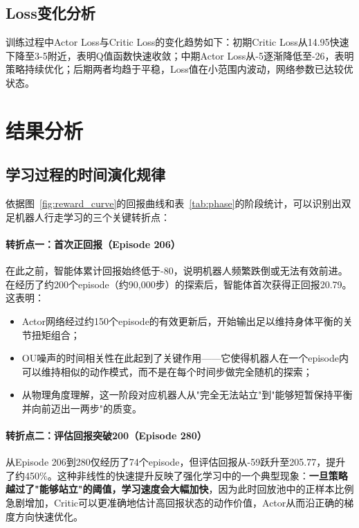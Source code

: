 \documentclass[UTF8,a4paper,12pt]{ctexart}
\begin{document}
\subsection{Loss变化分析}

训练过程中Actor Loss与Critic Loss的变化趋势如下：初期Critic Loss从14.95快速下降至3-5附近，表明Q值函数快速收敛；中期Actor Loss从-5逐渐降低至-26，表明策略持续优化；后期两者均趋于平稳，Loss值在小范围内波动，网络参数已达较优状态。

\section{结果分析}

\subsection{学习过程的时间演化规律}

依据图~\ref{fig:reward_curve}的回报曲线和表~\ref{tab:phase}的阶段统计，可以识别出双足机器人行走学习的三个关键转折点：

\paragraph{转折点一：首次正回报（Episode 206）}
在此之前，智能体累计回报始终低于-80，说明机器人频繁跌倒或无法有效前进。在经历了约200个episode（约90,000步）的探索后，智能体首次获得正回报20.79。这表明：
\begin{itemize}[leftmargin=2em]
  \item Actor网络经过约150个episode的有效更新后，开始输出足以维持身体平衡的关节扭矩组合；
  \item OU噪声的时间相关性在此起到了关键作用——它使得机器人在一个episode内可以维持相似的动作模式，而不是在每个时间步做完全随机的探索；
  \item 从物理角度理解，这一阶段对应机器人从"完全无法站立"到"能够短暂保持平衡并向前迈出一两步"的质变。
\end{itemize}

\paragraph{转折点二：评估回报突破200（Episode 280）}
从Episode 206到280仅经历了74个episode，但评估回报从-59跃升至205.77，提升了约450\%。这种非线性的快速提升反映了强化学习中的一个典型现象：\textbf{一旦策略越过了"能够站立"的阈值，学习速度会大幅加快}，因为此时回放池中的正样本比例急剧增加，Critic可以更准确地估计高回报状态的动作价值，Actor从而沿正确的梯度方向快速优化。
\end{document}
